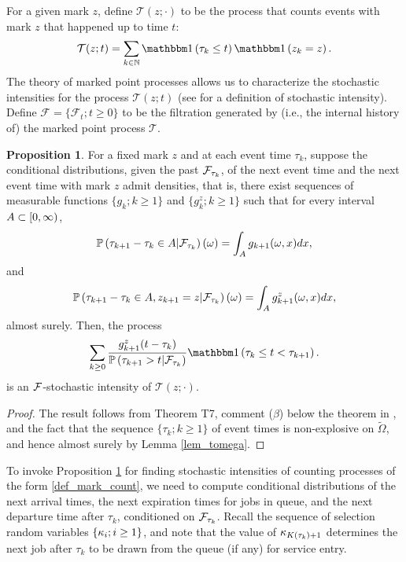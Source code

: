 \documentclass{article}
\theoremstyle{definition}
\newtheorem{proposition}[theorem]{Proposition}
\numberwithin{equation}{section}
\begin{document}
For a given mark $z$, define $\mathcal{T}(z;\cdot)$ to be the process that counts events with mark $z$ that happened up to time $t$:
\begin{equation}\label{def_mark_count}
    \mathcal{T}(z;t)= \sum_{k\in\N} \indic{\tau_k\leq t}\indic{z_k=z}.
\end{equation}
The theory of marked point processes allows us to characterize the stochastic intensities for the process $\mathcal{T}(z;t)$ (see \cite[Definition II.D7]{BremaudBook} for a definition of stochastic intensity). Define $\mathcal{F}=\{\mathcal{F}_t;t\geq0\}$ to be the filtration generated by (i.e., the internal history of) the marked point process $\mathcal{T}$.

\begin{proposition}\label{prop_intensity}
For a fixed mark $z$ and at each event time $\tau_k$, suppose the conditional distributions, given the past $\mathcal{F}_{\tau_k}$, of the next event time and the next event time with mark $z$ admit densities, that is, there exist sequences of measurable functions $\{g_k;k\geq1\}$ and $\{g_{k}^z;k\geq1\}$ such that for every interval $A\subset[0,\infty)$,
\begin{equation}\label{tau_density}
\mathbb{P}\left(\tau_{k+1}-\tau_k\in A|\mathcal{F}_{\tau_k}\right)(\omega)= \int_A g_{k+1}(\omega,x)dx,
\end{equation}
and
\[
\mathbb{P}\left(\tau_{k+1}-\tau_k\in A,z_{k+1}=z|\mathcal{F}_{\tau_k}\right)(\omega)= \int_A g_{k+1}^z(\omega,x)dx,
\]
almost surely. Then, the process
\begin{equation}\label{intensity_form}
\sum_{k\geq0}\frac{g_{k+1}^z(t-\tau_k)}{\Prob{\tau_{k+1}>t|\filt_{\tau_k}}}\indic{\tau_k\leq t < \tau_{k+1}}.
\end{equation}
is an $\mathcal{F}$-stochastic intensity of $\mathcal{T}(z;\cdot)$.
\end{proposition}
\begin{proof}
The result follows from Theorem T7, comment ($\beta$) below the theorem in  \cite[page 61]{BremaudBook}, and the fact that  the sequence $\{\tau_k;k\geq 1\}$ of event times is non-explosive on $\tilde\Omega$, and hence almost surely by Lemma \ref{lem_tomega}.
\end{proof}



To invoke Proposition \ref{prop_intensity} for finding stochastic intensities of counting processes of the form  \eqref{def_mark_count}, we need to compute conditional distributions of the next arrival times, the next expiration times for jobs in queue, and the next departure time after $\tau_k$, conditioned on ${\mathcal{F}_{\tau_k}}$. Recall the sequence of selection random variables $\{\kappa_i;i\geq1\}$, and note that the value of $\kappa_{K(\tau_k)+1}$ determines the next job after $\tau_k$ to be drawn from the queue (if any) for service entry.
\end{document}
